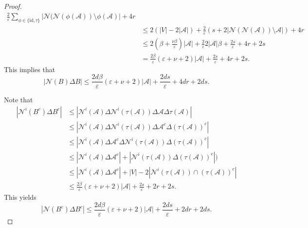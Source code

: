 \documentclass[ALCO,Unicode,published]{cedram}
\newcommand{\id}{\ensuremath{\mathrm{id}}}
\newcommand{\calN}{\ensuremath{\mathcal{N}}}
\newcommand{\scrA}{\ensuremath{\mathscr{A}}}
\begin{document}
\begin{proof}
\begin{align*}
\frac 2\varepsilon\sum_{\phi\in \{\id, \tau\}} |\calN(\calN(\phi(\scrA)) \setminus \phi(\scrA)| + 4r\\
& \leq 2(|V| - 2|\scrA|) + 
\frac 2\varepsilon (s+ 2 |\calN(\calN(\scrA)) \setminus \scrA| ) + 4r\\
& \leq 2\left(\beta + \frac{\nu\beta}\varepsilon \right)|\scrA| +\frac 2\varepsilon 2|\scrA|\beta + \frac {2s}\varepsilon   + 4r + 2s\\
& =  \frac{2\beta}\varepsilon (\varepsilon + \nu + 2)|\scrA| + \frac {2s}\varepsilon  + 4r + 2s.
\end{align*}
This implies that 
$$
|\calN(B) \Delta B|
\leq 
\frac{2d\beta}\varepsilon (\varepsilon + \nu + 2)|\scrA| +  \frac {2ds}\varepsilon  + 4dr + 2ds.
$$

Note that 
\begin{align*}
|\calN^i(B^c) \Delta B^c| 
& \leq |\calN^i(\scrA) \Delta \calN^i(\tau(\scrA)) \Delta \scrA \Delta\tau(\scrA)| \\
& \leq |\calN^i(\scrA) \Delta \calN^i(\tau(\scrA)) \Delta \scrA^c \Delta (\tau(\scrA))^c| \\
& \leq |\calN^i(\scrA) \Delta \scrA^c \Delta \calN^i(\tau(\scrA)) \Delta (\tau(\scrA))^c| \\
& \leq |\calN^i(\scrA) \Delta \scrA^c| + |\calN^i(\tau(\scrA)) \Delta (\tau(\scrA))^c| )\\
& \leq |\calN^i(\scrA) \Delta \scrA^c| + |V| - 2 |\calN^i(\tau(\scrA)) \cap (\tau(\scrA))^c| \\
& \leq \frac{2\beta}\varepsilon (\varepsilon + \nu + 2)|\scrA| + \frac {2s}\varepsilon  + 2r + 2s.
\end{align*}
This yields 
$$
|\calN(B^c) \Delta B^c|
\leq 
\frac{2d\beta}\varepsilon (\varepsilon + \nu + 2)|\scrA| + \frac {2ds}\varepsilon +  2dr + 2ds.
$$


\end{proof}
\end{document}
